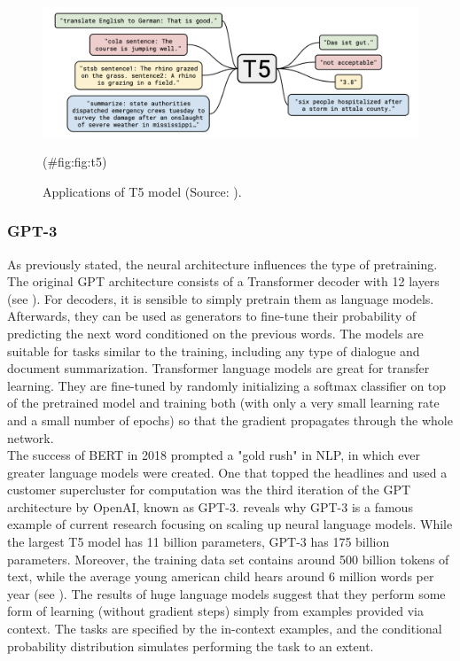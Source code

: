 \documentclass[
]{krantz}
\begin{document}
\begin{figure}

{\centering \includegraphics[width=0.8\linewidth]{./figures/01-01-nlp/t5_stanford} 

}

\caption{Applications of T5 model (Source: \citet{Raffel2019}).}(\#fig:fig:t5)
\end{figure}



\hypertarget{gpt-3}{%
\subsubsection{GPT-3}\label{gpt-3}}

As previously stated, the neural architecture influences the type of
pretraining. The original GPT architecture consists of a Transformer
decoder with 12 layers (see \citep{Radford2018}). For decoders, it is
sensible to simply pretrain them as language models. Afterwards, they
can be used as generators to fine-tune their probability of predicting
the next word conditioned on the previous words. The models are suitable
for tasks similar to the training, including any type of dialogue and
document summarization. Transformer language models are great for
transfer learning. They are fine-tuned by randomly initializing a
softmax classifier on top of the pretrained model and training both
(with only a very small learning rate and a small number of epochs) so
that the gradient propagates through the whole network.\\
The success of BERT in 2018 prompted a "gold rush" in NLP, in which
ever greater language models were created. One that topped the headlines
and used a customer supercluster for computation was the third iteration
of the GPT architecture by OpenAI, known as GPT-3. reveals why GPT-3 is
a famous example of current research focusing on scaling up neural
language models. While the largest T5 model has 11 billion parameters,
GPT-3 has 175 billion parameters. Moreover, the training data set
contains around 500 billion tokens of text, while the average young
american child hears around 6 million words per year (see \citep{Hart1995}).
The results of huge language models suggest that they perform some form
of learning (without gradient steps) simply from examples provided via
context. The tasks are specified by the in-context examples, and the
conditional probability distribution simulates performing the task to an
extent.
\end{document}
